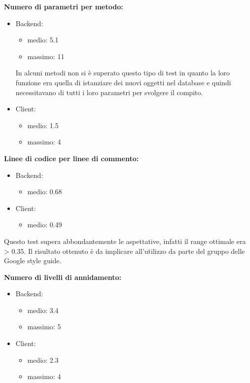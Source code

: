 \begin{description}
				\item \textbf{Numero di parametri per metodo:}
					\begin{itemize}
						\item Backend:
							\begin{itemize}
								\item medio: 5.1
								\item massimo: 11
							\end{itemize}
						In alcuni metodi non si è superato questo tipo di test in quanto la loro funzione era quella di istanziare dei nuovi oggetti nel database e quindi necessitavano di tutti i loro parametri per svolgere il compito.
						\item Client:
							\begin{itemize}
								\item medio: 1.5
								\item massimo: 4
							\end{itemize}
					\end{itemize}
					
				\item \textbf{Linee di codice per linee di commento:}
					\begin{itemize}
						\item Backend:
							\begin{itemize}
								\item medio: 0.68
							\end{itemize}
						\item Client:
							\begin{itemize}
								\item medio: 0.49
							\end{itemize}
					\end{itemize}
				Questo test supera abbondantemente le aspettative, infatti il range ottimale era > 0.35. Il risultato ottenuto è da implicare all'utilizzo da parte del gruppo delle Google style guide. 
							
				\item \textbf{Numero di livelli di annidamento:}
					\begin{itemize}
						\item Backend:
							\begin{itemize}
								\item medio: 3.4
								\item massimo: 5
							\end{itemize}
						\item Client:
							\begin{itemize}
								\item medio: 2.3
								\item massimo: 4
							\end{itemize}
					\end{itemize}
					

\end{description}
